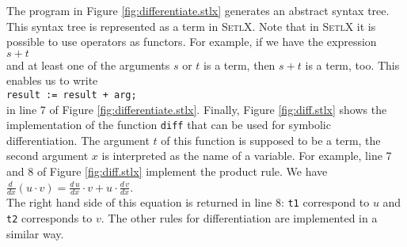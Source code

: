 The program in Figure \ref{fig:differentiate.stlx} generates an abstract syntax tree.
This syntax tree is represented as a term in \textsc{SetlX}.  Note that in \textsc{SetlX}
it is possible to use operators as functors.  For example, if we have the expression
\\[0.2cm]
\hspace*{1.3cm}
$s + t$
\\[0.2cm]
and at least one of the arguments $s$ or $t$ is a term, then $s + t$ is a term, too.
This enables us to write
\\[0.2cm]
\hspace*{1.3cm}
\texttt{result := result + arg;}
\\[0.2cm]
in line 7 of Figure \ref{fig:differentiate.stlx}.  Finally, Figure \ref{fig:diff.stlx}
shows the implementation of the function \texttt{diff} that can be used for symbolic
differentiation.  The argument $t$ of this function is supposed to be a term, the second
argument $x$ is interpreted as the name of a variable.  For example, line 7 and 8 of Figure
\ref{fig:diff.stlx} implement the product rule.  We have
\\[0.2cm]
\hspace*{1.3cm}
$\frac{d\;}{dx}(u \cdot v) = \frac{d\,u}{dx} \cdot v + u \cdot \frac{d\,v}{dx}$. 
\\[0.2cm]
The right hand side of this equation is returned in line 8: \texttt{t1} correspond to $u$
and \texttt{t2} corresponds to $v$.  The other rules for differentiation are implemented
in a similar way.

